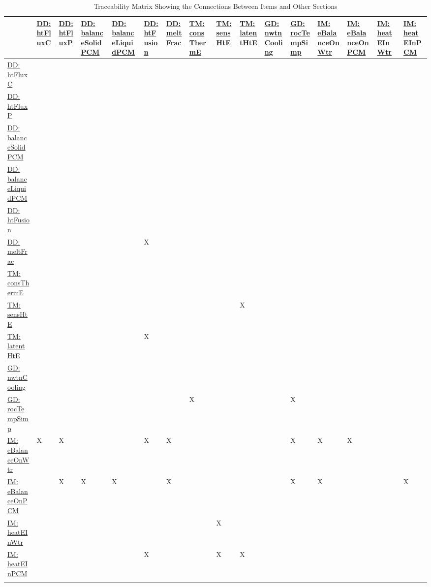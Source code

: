 \documentclass[12pt]{article}
\begin{document}
\begin{longtable}{l l l l l l l l l l l l l l l l}
\toprule
 & \hyperref[DD:htFluxC]{DD: htFluxC} & \hyperref[DD:htFluxP]{DD: htFluxP} & \hyperref[DD:balanceSolidPCM]{DD: balanceSolidPCM} & \hyperref[DD:balanceLiquidPCM]{DD: balanceLiquidPCM} & \hyperref[DD:htFusion]{DD: htFusion} & \hyperref[DD:meltFrac]{DD: meltFrac} & \hyperref[TM:consThermE]{TM: consThermE} & \hyperref[TM:sensHtE]{TM: sensHtE} & \hyperref[TM:latentHtE]{TM: latentHtE} & \hyperref[GD:nwtnCooling]{GD: nwtnCooling} & \hyperref[GD:rocTempSimp]{GD: rocTempSimp} & \hyperref[IM:eBalanceOnWtr]{IM: eBalanceOnWtr} & \hyperref[IM:eBalanceOnPCM]{IM: eBalanceOnPCM} & \hyperref[IM:heatEInWtr]{IM: heatEInWtr} & \hyperref[IM:heatEInPCM]{IM: heatEInPCM}
\\
\midrule
\endhead
\hyperref[DD:htFluxC]{DD: htFluxC} &  &  &  &  &  &  &  &  &  &  &  &  &  &  & 
\\
\hyperref[DD:htFluxP]{DD: htFluxP} &  &  &  &  &  &  &  &  &  &  &  &  &  &  & 
\\
\hyperref[DD:balanceSolidPCM]{DD: balanceSolidPCM} &  &  &  &  &  &  &  &  &  &  &  &  &  &  & 
\\
\hyperref[DD:balanceLiquidPCM]{DD: balanceLiquidPCM} &  &  &  &  &  &  &  &  &  &  &  &  &  &  & 
\\
\hyperref[DD:htFusion]{DD: htFusion} &  &  &  &  &  &  &  &  &  &  &  &  &  &  & 
\\
\hyperref[DD:meltFrac]{DD: meltFrac} &  &  &  &  & X &  &  &  &  &  &  &  &  &  & 
\\
\hyperref[TM:consThermE]{TM: consThermE} &  &  &  &  &  &  &  &  &  &  &  &  &  &  & 
\\
\hyperref[TM:sensHtE]{TM: sensHtE} &  &  &  &  &  &  &  &  & X &  &  &  &  &  & 
\\
\hyperref[TM:latentHtE]{TM: latentHtE} &  &  &  &  & X &  &  &  &  &  &  &  &  &  & 
\\
\hyperref[GD:nwtnCooling]{GD: nwtnCooling} &  &  &  &  &  &  &  &  &  &  &  &  &  &  & 
\\
\hyperref[GD:rocTempSimp]{GD: rocTempSimp} &  &  &  &  &  &  & X &  &  &  & X &  &  &  & 
\\
\hyperref[IM:eBalanceOnWtr]{IM: eBalanceOnWtr} & X & X &  &  & X & X &  &  &  &  & X & X & X &  & 
\\
\hyperref[IM:eBalanceOnPCM]{IM: eBalanceOnPCM} &  & X & X & X &  & X &  &  &  &  & X & X &  &  & X
\\
\hyperref[IM:heatEInWtr]{IM: heatEInWtr} &  &  &  &  &  &  &  & X &  &  &  &  &  &  & 
\\
\hyperref[IM:heatEInPCM]{IM: heatEInPCM} &  &  &  &  & X &  &  & X & X &  &  &  &  &  & 
\\
\bottomrule
\caption{Traceability Matrix Showing the Connections Between Items and Other Sections}
\label{Table:TraceMatRefvsRef}
\end{longtable}
\end{document}
